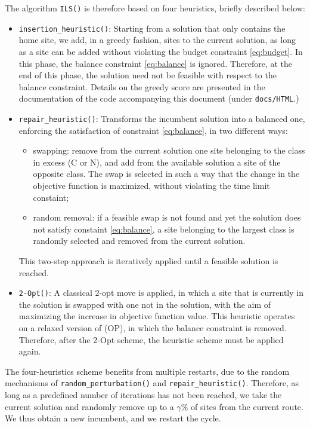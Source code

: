 \documentclass[12pt]{article}
\begin{document}
The algorithm \texttt{ILS()} is therefore based on four heuristics, briefly
described below:
\begin{itemize}
\item \texttt{insertion\_heuristic()}: Starting from a solution that only
contains the home site, we add, in a greedy fashion, sites to the current
solution, as long as a site can be added without violating the budget
constraint \eqref{eq:budget}. In this phase, the balance constraint
\eqref{eq:balance} is ignored. Therefore, at the end of this phase, the
solution need not be feasible with respect to the balance constraint. Details
on the greedy score are presented in the documentation of the code accompanying
this document (under \texttt{docs/HTML}.)
\item \texttt{repair\_heuristic()}: Transforms the incumbent solution into a
balanced one, enforcing the satisfaction of constraint \eqref{eq:balance}, in
two different ways:
\begin{itemize}
\item swapping: remove from the current solution one site belonging to the
class in excess (C or N), and add from the available solution a site of the
opposite class. The swap is selected in such a way that the change in the
objective function is maximized, without violating the time limit constaint;
\item random removal: if a feasible swap is not found and yet the solution does
not satisfy constaint \eqref{eq:balance}, a site belonging to the largest class
is randomly selected and removed from the current solution.
\end{itemize}
This two-step approach is iteratively applied until a feasible solution is
reached.
\item \texttt{2-Opt()}: A classical 2-opt move is applied, in which a site that
is currently in the solution is swapped with one not in the solution, with the
aim of maximizing the increase in objective function value. This heuristic
operates on a relaxed version of (OP), in which the balance constraint is
removed. Therefore, after the 2-Opt scheme, the heuristic scheme must be
applied again.
\end{itemize}

The four-heuristics scheme benefits from multiple restarts, due to the random
mechanisms of \texttt{random\_perturbation()} and
\texttt{repair\_heuristic()}. Therefore, as long as a predefined number of
iterations has not been reached, we take the current solution and randomly
remove up to a $\gamma\%$ of sites from the current route. We thus obtain a new
incumbent, and we restart the cycle.
\end{document}
